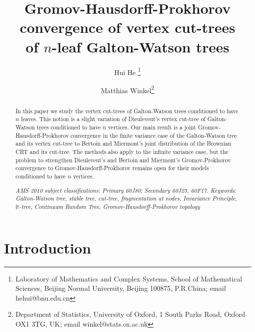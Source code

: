 \documentclass[11pt,a4paper]{article}
\begin{document}
\title{\vspace{-0.7cm}
Gromov-Hausdorff-Prokhorov convergence of vertex cut-trees\\ of $n$-leaf Galton-Watson trees}
\author{
Hui He%
\thanks{%
Laboratory of Mathematics and Complex Systems, School of Mathematical Sciences, Beijing Normal University, Beijing 100875, P.R.China; email hehui@bnu.edu.cn}
\and
Matthias Winkel\thanks{%
Department of Statistics, University of Oxford, 1 South Parks Road, Oxford OX1 3TG, UK; email winkel@stats.ox.ac.uk}}


\maketitle

\vspace{-0.4cm}

\begin{abstract} In this paper we study the vertex cut-trees of Galton-Watson trees conditioned to have $n$ leaves. This notion is a slight variation of Dieuleveut's
  vertex cut-tree of Galton-Watson trees conditioned to have $n$ vertices. Our main result is a joint Gromov-Hausdorff-Prokhorov convergence in the finite variance case
  of the Galton-Watson tree and its vertex cut-tree to Bertoin and Miermont's joint distribution of the Brownian CRT and its cut-tree. The methods also apply to the
  infinite variance case, but the problem to strengthen Dieuleveut's and Bertoin and Miermont's Gromov-Prokhorov convergence to Gromov-Hausdorff-Prokhorov remains open
  for their models conditioned to have $n$ vertices.

\emph{AMS 2010 subject classifications: Primary 60J80; Secondary 60J25, 60F17.\newline
Keywords: Galton-Watson tree, stable tree, cut-tree, fragmentation at nodes, Invariance Principle, $\mathbb{R}$-tree, Continuum Random Tree, Gromov-Hausdorff-Prokhorov topology}
\end{abstract}

\section{Introduction}
\end{document}
